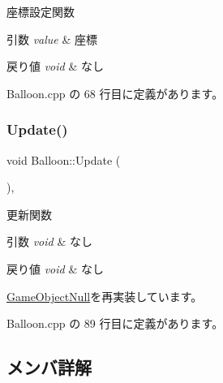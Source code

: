 座標設定関数 


\begin{DoxyParams}{引数}
{\em value} & 座標 \\
\hline
\end{DoxyParams}

\begin{DoxyRetVals}{戻り値}
{\em void} & なし \\
\hline
\end{DoxyRetVals}


 Balloon.\+cpp の 68 行目に定義があります。

\mbox{\label{class_balloon_ac924b8fb0e2ba4a2a3bae0b7fed6ad13}} 
\subsubsection{\texorpdfstring{Update()}{Update()}}
{\footnotesize\ttfamily void Balloon\+::\+Update (\begin{DoxyParamCaption}{ }\end{DoxyParamCaption})\hspace{0.3cm}{\ttfamily [override]}, {\ttfamily [virtual]}}



更新関数 


\begin{DoxyParams}{引数}
{\em void} & なし \\
\hline
\end{DoxyParams}

\begin{DoxyRetVals}{戻り値}
{\em void} & なし \\
\hline
\end{DoxyRetVals}


\mbox{\hyperlink{class_game_object_null_aeeb51b7e7aa41fd0b16f8f7c016bdb55}{Game\+Object\+Null}}を再実装しています。



 Balloon.\+cpp の 89 行目に定義があります。



\subsection{メンバ詳解}
\mbox{\label{class_balloon_afd563b3d30d5095afe3879fe6e609023}} 
